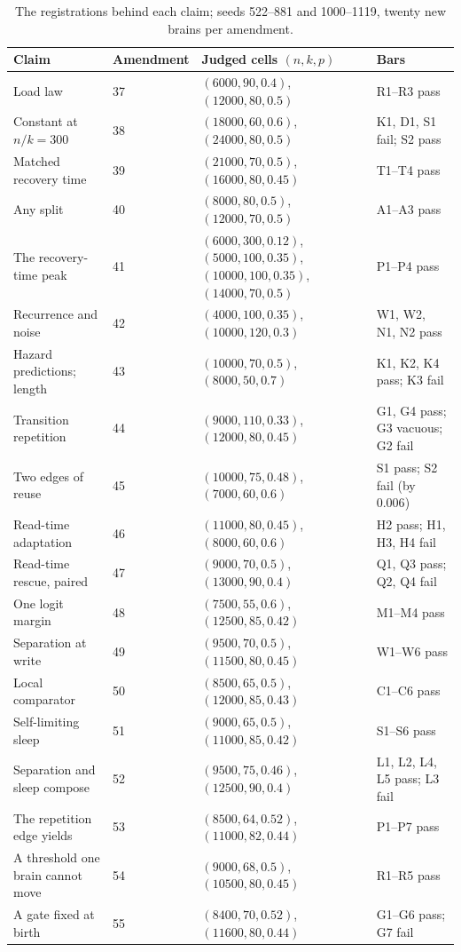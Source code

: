 \documentclass[11pt]{article}
\theoremstyle{definition}
\theoremstyle{plain}
\begin{document}
\begin{table}[h]
\centering\small
\begin{tabular}{p{}lp{}p{}}
\toprule
Claim & Amendment & Judged cells $(n,k,p)$ & Bars \\
\midrule
Load law & 37 & $(6000,90,0.4)$, $(12000,80,0.5)$ & R1--R3 pass \\
Constant at $n/k = 300$ & 38 & $(18000,60,0.6)$, $(24000,80,0.5)$ & K1, D1, S1 fail; S2 pass \\
Matched recovery time & 39 & $(21000,70,0.5)$, $(16000,80,0.45)$ & T1--T4 pass \\
Any split & 40 & $(8000,80,0.5)$, $(12000,70,0.5)$ & A1--A3 pass \\
The recovery-time peak & 41 & $(6000,300,0.12)$, $(5000,100,0.35)$, $(10000,100,0.35)$, $(14000,70,0.5)$ & P1--P4 pass \\
Recurrence and noise & 42 & $(4000,100,0.35)$, $(10000,120,0.3)$ & W1, W2, N1, N2 pass \\
Hazard predictions; length & 43 & $(10000,70,0.5)$, $(8000,50,0.7)$ & K1, K2, K4 pass; K3 fail \\
Transition repetition & 44 & $(9000,110,0.33)$, $(12000,80,0.45)$ & G1, G4 pass; G3 vacuous; G2 fail \\
Two edges of reuse & 45 & $(10000,75,0.48)$, $(7000,60,0.6)$ & S1 pass; S2 fail (by $0.006$) \\
Read-time adaptation & 46 & $(11000,80,0.45)$, $(8000,60,0.6)$ & H2 pass; H1, H3, H4 fail \\
Read-time rescue, paired & 47 & $(9000,70,0.5)$, $(13000,90,0.4)$ & Q1, Q3 pass; Q2, Q4 fail \\
One logit margin & 48 & $(7500,55,0.6)$, $(12500,85,0.42)$ & M1--M4 pass \\
Separation at write & 49 & $(9500,70,0.5)$, $(11500,80,0.45)$ & W1--W6 pass \\
Local comparator & 50 & $(8500,65,0.5)$, $(12000,85,0.43)$ & C1--C6 pass \\
Self-limiting sleep & 51 & $(9000,65,0.5)$, $(11000,85,0.42)$ & S1--S6 pass \\
Separation and sleep compose & 52 & $(9500,75,0.46)$, $(12500,90,0.4)$ & L1, L2, L4, L5 pass; L3 fail \\
The repetition edge yields & 53 & $(8500,64,0.52)$, $(11000,82,0.44)$ & P1--P7 pass \\
A threshold one brain cannot move & 54 & $(9000,68,0.5)$, $(10500,80,0.45)$ & R1--R5 pass \\
A gate fixed at birth & 55 & $(8400,70,0.52)$, $(11600,80,0.44)$ & G1--G6 pass; G7 fail \\
\bottomrule
\end{tabular}
\caption{The registrations behind each claim; seeds 522--881 and 1000--1119, twenty new brains
per amendment.}
\label{tab:methods}
\end{table}
\end{document}
